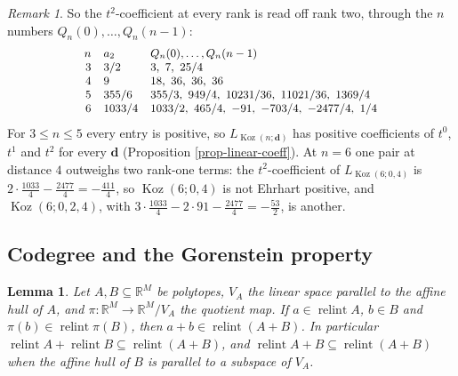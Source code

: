 \documentclass[11pt, a4paper, abstract=yes]{scrartcl}
\theoremstyle{definition}
\theoremstyle{remark}
\newtheorem{remark}[definition]{Remark}
\theoremstyle{plain}
\newtheorem{lemma}[definition]{Lemma}
\newcommand{\vek}[1]{\boldsymbol{#1}}
\theoremstyle{remark}
\theoremstyle{plain}
\newcommand{\Koz}{\operatorname{Koz}}
\newcommand{\relint}{\operatorname{relint}}
\newcommand{\leannone}{\tikz[baseline=-0.6ex]\draw[leannone,line width=0.6pt] (0,0) circle (0.55ex);}
\newcommand{\leanmark}[1]{\leavevmode{\reversemarginpar\marginnote{\raggedleft#1}}}
\begin{document}
\begin{remark}
So the \(t^2\)-coefficient at every rank is read off rank two, through the \(n\) numbers
\(Q_n(0),\dots,Q_n(n-1)\):
\[\small
\begin{array}{rll}
n & a_2 & Q_n(0),\dots,Q_n(n-1)\\
3 & 3/2 & 3,\ 7,\ 25/4\\
4 & 9 & 18,\ 36,\ 36,\ 36\\
5 & 355/6 & 355/3,\ 949/4,\ 10231/36,\ 11021/36,\ 1369/4\\
6 & 1033/4 & 1033/2,\ 465/4,\ -91,\ -703/4,\ -2477/4,\ 1/4
\end{array}
\]
For \(3\le n\le5\) every entry is positive, so \(L_{\Koz(n;\vek d)}\) has positive coefficients of \(t^0\),
\(t^1\) and \(t^2\) for every \(\vek d\) (Proposition \ref{prop-linear-coeff}). At \(n=6\) one pair at
distance \(4\) outweighs two rank-one terms: the \(t^2\)-coefficient of \(L_{\Koz(6;0,4)}\) is
\(2\cdot\tfrac{1033}4-\tfrac{2477}4=-\tfrac{411}4\), so \(\Koz(6;0,4)\) is not Ehrhart positive, and
\(\Koz(6;0,2,4)\), with \(3\cdot\tfrac{1033}4-2\cdot91-\tfrac{2477}4=-\tfrac{53}2\), is another.
\label{rem-quadratic-coeff}
\end{remark}
\subsection{Codegree and the Gorenstein property}
\label{sec:orgf3e9535}

\begin{lemma}
\leanmark{\leannone}Let \(A,B\subseteq\mathbb R^M\) be polytopes, \(V_A\) the linear space parallel to the affine hull of
\(A\), and \(\pi\colon\mathbb R^M\to\mathbb R^M/V_A\) the quotient map. If \(a\in\relint A\), \(b\in B\)
and \(\pi(b)\in\relint\pi(B)\), then \(a+b\in\relint(A+B)\). In particular
\(\relint A+\relint B\subseteq\relint(A+B)\), and \(\relint A+B\subseteq\relint(A+B)\) when the affine hull of
\(B\) is parallel to a subspace of \(V_A\).
\label{lem-relint-sum}
\end{lemma}
\end{document}
